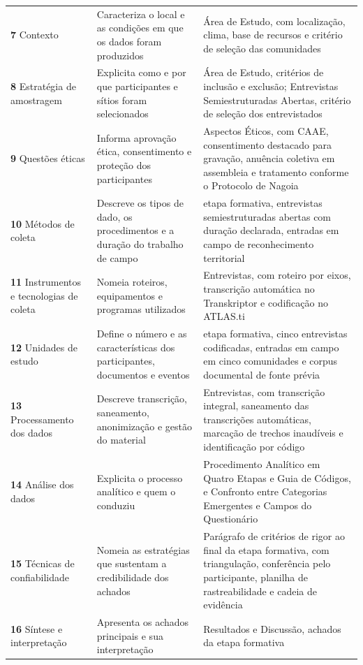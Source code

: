 {\begin{longtable}{p{3.6cm}p{4.6cm}p{5.6cm}}
\addlinespace
\textbf{7} Contexto & Caracteriza o local e as condições em que os dados foram produzidos & Área de Estudo, com localização, clima, base de recursos e critério de seleção das comunidades \\
\addlinespace
\textbf{8} Estratégia de amostragem & Explicita como e por que participantes e sítios foram selecionados & Área de Estudo, critérios de inclusão e exclusão; Entrevistas Semiestruturadas Abertas, critério de seleção dos entrevistados \\
\addlinespace
\textbf{9} Questões éticas & Informa aprovação ética, consentimento e proteção dos participantes & Aspectos Éticos, com CAAE, consentimento destacado para gravação, anuência coletiva em assembleia e tratamento conforme o Protocolo de Nagoia \\
\addlinespace
\textbf{10} Métodos de coleta & Descreve os tipos de dado, os procedimentos e a duração do trabalho de campo & etapa formativa, entrevistas semiestruturadas abertas com duração declarada, entradas em campo de reconhecimento territorial \\
\addlinespace
\textbf{11} Instrumentos e tecnologias de coleta & Nomeia roteiros, equipamentos e programas utilizados & Entrevistas, com roteiro por eixos, transcrição automática no Transkriptor e codificação no ATLAS.ti \\
\addlinespace
\textbf{12} Unidades de estudo & Define o número e as características dos participantes, documentos e eventos & etapa formativa, cinco entrevistas codificadas, entradas em campo em cinco comunidades e corpus documental de fonte prévia \\
\addlinespace
\textbf{13} Processamento dos dados & Descreve transcrição, saneamento, anonimização e gestão do material & Entrevistas, com transcrição integral, saneamento das transcrições automáticas, marcação de trechos inaudíveis e identificação por código \\
\addlinespace
\textbf{14} Análise dos dados & Explicita o processo analítico e quem o conduziu & Procedimento Analítico em Quatro Etapas e Guia de Códigos, e Confronto entre Categorias Emergentes e Campos do Questionário \\
\addlinespace
\textbf{15} Técnicas de confiabilidade & Nomeia as estratégias que sustentam a credibilidade dos achados & Parágrafo de critérios de rigor ao final da etapa formativa, com triangulação, conferência pelo participante, planilha de rastreabilidade e cadeia de evidência \\
\addlinespace
\textbf{16} Síntese e interpretação & Apresenta os achados principais e sua interpretação & Resultados e Discussão, achados da etapa formativa \\

\end{longtable}}
